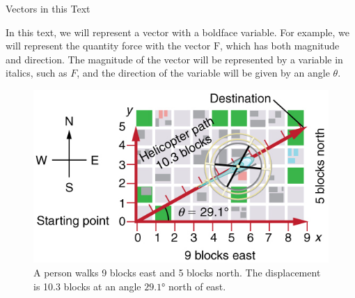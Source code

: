 \documentclass[
]{book}
\newenvironment{note}{}{}
\begin{document}
\hypertarget{fs-id1165296218458}{}
\begin{note}

Vectors in this Text

In this text, we will represent a vector with a boldface variable. For
example, we will represent the quantity force with the vector
\(\text{F}{}\), which has both magnitude and direction. The magnitude of
the vector will be represented by a variable in italics, such as \(F{}\),
and the direction of the variable will be given by an angle \(\theta{}\).

\end{note}

\begin{figure}
\hypertarget{import-auto-id1165298666909}{%
\centering
\includegraphics{images/Figure_03_02_01.jpg}
\caption{A person walks 9 blocks east and 5 blocks north. The displacement is
10.3 blocks at an angle \({\text{29}\text{.1°}}{}\) north of
east.}\label{import-auto-id1165298666909}
}
\end{figure}
\end{document}
